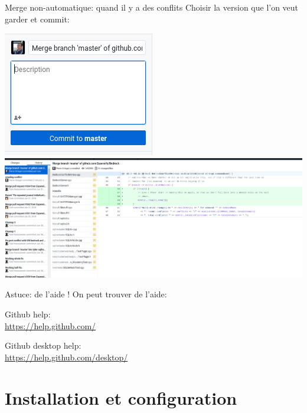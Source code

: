 \documentclass{beamer}
\begin{document}
\begin{frame}{Merge non-automatique: quand il y a des conflits}
    Choisir la version que l'on veut garder et commit:\\
    \begin{center}
	 	   \includegraphics[scale=0.4]{img/github_desktop/conflit_4.png}\\
	 	   \includegraphics[scale=0.2]{img/github_desktop/conflit_5.png}
    \end{center}
\end{frame}

\begin{frame}{Astuce: de l'aide !}
    On peut trouver de l'aide:
    
    \begin{center}
    	Github help:\\ \url{https://help.github.com/}
	\end{center}
	\begin{center}
	    Github desktop help:\\ \url{https://help.github.com/desktop/}
	\end{center}        
\end{frame}


\section{Installation et configuration}
\end{document}
